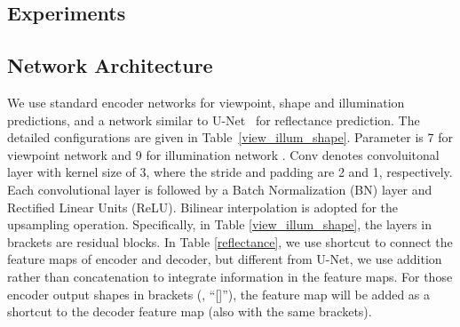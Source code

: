 \begin{appendix}
\newpage
\section{Experiments}
\subsection{Network Architecture}
\label{netarch}
We use standard encoder networks
for viewpoint, shape and illumination predictions, and a network similar to U-Net~\cite{ronneberger2015u} for reflectance prediction. The detailed configurations are given in Table~\ref{view_illum_shape}. Parameter  is 7 for viewpoint network  and 9 for illumination network . Conv  denotes convoluitonal layer with kernel size of 3, where the stride and padding are 2 and 1, respectively. Each convolutional layer is followed by a Batch Normalization (BN) \cite{ioffe2015batch} layer and Rectified Linear Units (ReLU). Bilinear interpolation is adopted for the upsampling operation. Specifically, in Table \ref{view_illum_shape}, the layers in brackets are residual blocks. In Table \ref{reflectance}, we use shortcut to connect the feature maps of encoder and decoder, but different from U-Net, we use addition rather than concatenation to integrate information in the feature maps. For those encoder output shapes in brackets (\eg, ``[]''), the feature map will be added as a shortcut to the decoder feature map (also with the same brackets).


\end{appendix}
